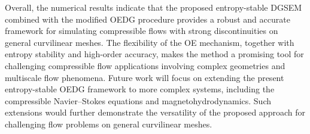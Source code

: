 \documentclass[fleqn,11pt]{amsart}
\begin{document}
{Overall, the numerical results indicate that the proposed entropy-stable DGSEM combined with the modified OEDG procedure provides a robust and accurate framework for simulating compressible flows with strong discontinuities on general curvilinear meshes.
The flexibility of the OE mechanism, together with entropy stability and high-order accuracy, makes the method a promising tool for challenging compressible flow applications involving complex geometries and multiscale flow phenomena. Future work will focus on extending the present entropy-stable OEDG framework to more complex systems, including the compressible Navier–Stokes equations and magnetohydrodynamics. Such extensions would further demonstrate the versatility of the proposed approach for challenging flow problems on general curvilinear meshes.

}
\end{document}

